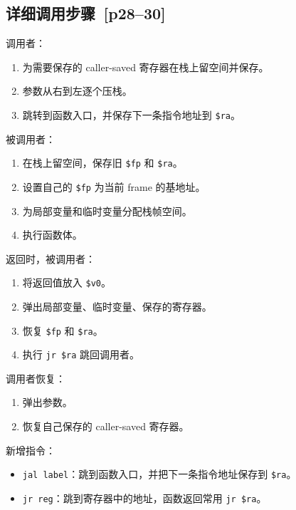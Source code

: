 \documentclass[UTF8,fontset=none,11pt]{ctexart}
\newcommand{\pg}[1]{\texorpdfstring{{\small\color{graytext}\,[p#1]}}{ [p#1]}}
\begin{document}
\subsection{详细调用步骤 \pg{28--30}}

调用者：

\begin{enumerate}
  \item 为需要保存的 caller-saved 寄存器在栈上留空间并保存。
  \item 参数从右到左逐个压栈。
  \item 跳转到函数入口，并保存下一条指令地址到 \texttt{\$ra}。
\end{enumerate}

被调用者：

\begin{enumerate}
  \item 在栈上留空间，保存旧 \texttt{\$fp} 和 \texttt{\$ra}。
  \item 设置自己的 \texttt{\$fp} 为当前 frame 的基地址。
  \item 为局部变量和临时变量分配栈帧空间。
  \item 执行函数体。
\end{enumerate}

返回时，被调用者：

\begin{enumerate}
  \item 将返回值放入 \texttt{\$v0}。
  \item 弹出局部变量、临时变量、保存的寄存器。
  \item 恢复 \texttt{\$fp} 和 \texttt{\$ra}。
  \item 执行 \texttt{jr \$ra} 跳回调用者。
\end{enumerate}

调用者恢复：

\begin{enumerate}
  \item 弹出参数。
  \item 恢复自己保存的 caller-saved 寄存器。
\end{enumerate}

新增指令：

\begin{itemize}
  \item \texttt{jal label}：跳到函数入口，并把下一条指令地址保存到 \texttt{\$ra}。
  \item \texttt{jr reg}：跳到寄存器中的地址，函数返回常用 \texttt{jr \$ra}。
\end{itemize}
\end{document}
